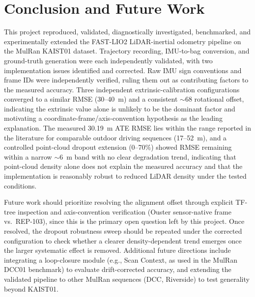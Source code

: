 \documentclass[conference]{IEEEtran}
\begin{document}
\section{Conclusion and Future Work}
This project reproduced, validated, diagnostically investigated, benchmarked, and experimentally extended the FAST-LIO2 LiDAR-inertial odometry pipeline on the MulRan KAIST01 dataset. Trajectory recording, IMU-to-bag conversion, and ground-truth generation were each independently validated, with two implementation issues identified and corrected. Raw IMU sign conventions and frame IDs were independently verified, ruling them out as contributing factors to the measured accuracy. Three independent extrinsic-calibration configurations converged to a similar RMSE (30--40~m) and a consistent $\sim$68\textdegree{} rotational offset, indicating the extrinsic value alone is unlikely to be the dominant factor and motivating a coordinate-frame/axis-convention hypothesis as the leading explanation. The measured 30.19~m ATE RMSE lies within the range reported in the literature for comparable outdoor driving sequences (17--52~m), and a controlled point-cloud dropout extension (0--70\%) showed RMSE remaining within a narrow $\sim$6~m band with no clear degradation trend, indicating that point-cloud density alone does not explain the measured accuracy and that the implementation is reasonably robust to reduced LiDAR density under the tested conditions.

Future work should prioritize resolving the alignment offset through explicit TF-tree inspection and axis-convention verification (Ouster sensor-native frame vs.\ REP-103), since this is the primary open question left by this project. Once resolved, the dropout robustness sweep should be repeated under the corrected configuration to check whether a clearer density-dependent trend emerges once the larger systematic effect is removed. Additional future directions include integrating a loop-closure module (e.g., Scan Context, as used in the MulRan DCC01 benchmark) to evaluate drift-corrected accuracy, and extending the validated pipeline to other MulRan sequences (DCC, Riverside) to test generality beyond KAIST01.
\end{document}

